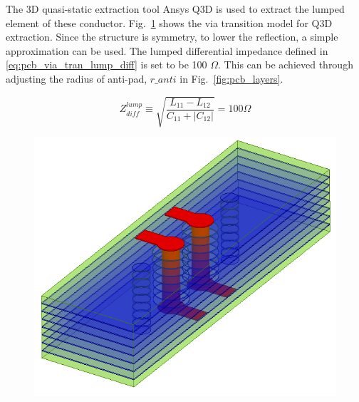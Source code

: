 \documentclass{book}  %
\begin{document}
\begin{paper}
The 3D quasi-static extraction tool Ansys Q3D \cite{na_ansys_q3d} is used to extract the lumped element of these conductor. Fig.~\ref{fig:pcb_via_tran_Q3D} shows the via transition model for Q3D extraction. Since the structure is symmetry, to lower the reflection, a simple approximation can be used. The lumped differential impedance defined in \ref{eq:pcb_via_tran_lump_diff} is set to be 100 $\Omega$. This can be achieved through adjusting the radius of anti-pad, $r\_anti$ in Fig.~\ref{fig:pcb_layers}.

\begin{equation}\label{eq:pcb_via_tran_lump_diff}
Z^{lump}_{diff}\equiv \sqrt{\frac{L_{11} - L_{12}}{C_{11} + \left|C_{12}\right|}} = 100\Omega
\end{equation}

\begin{figure}[htbp!]
	\centering	
	\begin{minipage}[b]{0.5\linewidth}
		\includegraphics[width=\textwidth]{./img/PCB/Via_Transition/Q3D_tuned_side.png}
		\label{fig:pcb_via_tran_Q3D}
	\end{minipage}%
	\begin{minipage}[b]{0.5\linewidth}

\end{minipage}
\end{figure}
\end{paper}
\end{document}
